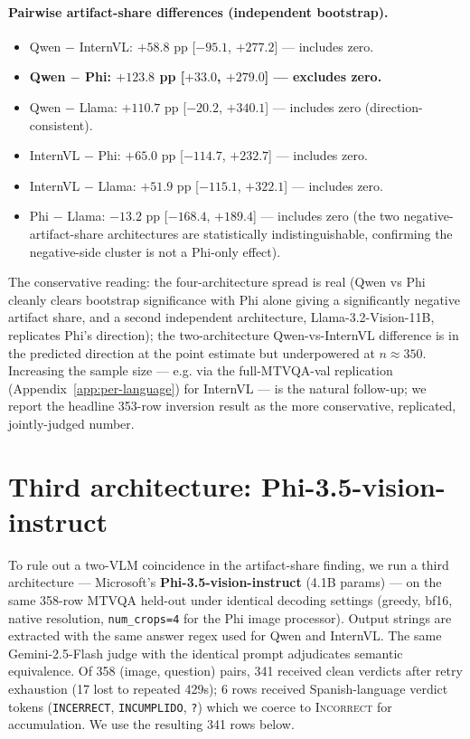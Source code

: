 \paragraph{Pairwise artifact-share differences (independent bootstrap).}
\begin{itemize}
\item Qwen $-$ InternVL: $+58.8$ pp [$-95.1$, $+277.2$] --- includes zero.
\item \textbf{Qwen $-$ Phi: $+123.8$ pp [$+33.0$, $+279.0$] --- excludes zero.}
\item Qwen $-$ Llama: $+110.7$ pp [$-20.2$, $+340.1$] --- includes zero (direction-consistent).
\item InternVL $-$ Phi: $+65.0$ pp [$-114.7$, $+232.7$] --- includes zero.
\item InternVL $-$ Llama: $+51.9$ pp [$-115.1$, $+322.1$] --- includes zero.
\item Phi $-$ Llama: $-13.2$ pp [$-168.4$, $+189.4$] --- includes zero (the two negative-artifact-share architectures are statistically indistinguishable, confirming the negative-side cluster is not a Phi-only effect).
\end{itemize}
The conservative reading: the four-architecture spread is real (Qwen vs Phi cleanly clears bootstrap significance with Phi alone giving a significantly negative artifact share, and a second independent architecture, Llama-3.2-Vision-11B, replicates Phi's direction); the two-architecture Qwen-vs-InternVL difference is in the predicted direction at the point estimate but underpowered at $n \approx 350$. Increasing the sample size --- e.g. via the full-MTVQA-val replication (Appendix~\ref{app:per-language}) for InternVL --- is the natural follow-up; we report the headline 353-row inversion result as the more conservative, replicated, jointly-judged number.

\section{Third architecture: Phi-3.5-vision-instruct}
\label{app:third-vlm}

To rule out a two-VLM coincidence in the artifact-share finding, we run a third architecture --- Microsoft's \textbf{Phi-3.5-vision-instruct} (4.1B params) --- on the same 358-row MTVQA held-out under identical decoding settings (greedy, bf16, native resolution, \texttt{num\_crops=4} for the Phi image processor). Output strings are extracted with the same answer regex used for Qwen and InternVL. The same Gemini-2.5-Flash judge with the identical prompt adjudicates semantic equivalence. Of 358 (image, question) pairs, 341 received clean verdicts after retry exhaustion (17 lost to repeated 429s); 6 rows received Spanish-language verdict tokens (\texttt{INCERRECT}, \texttt{INCUMPLIDO}, \texttt{?}) which we coerce to \textsc{Incorrect} for accumulation. We use the resulting 341 rows below.


